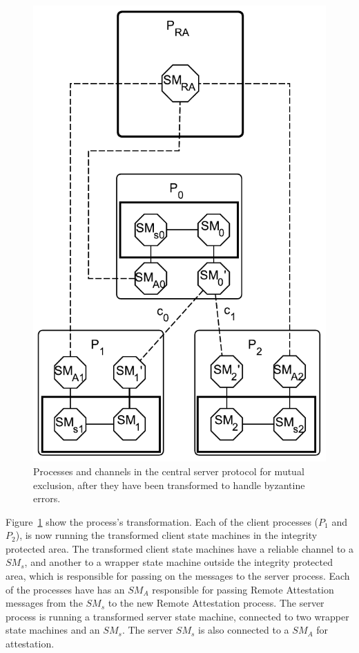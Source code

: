 \documentclass{article}
\begin{document}
		\FloatBarrier
		\begin{figure}[ht!]
			\center
			\includegraphics[scale=0.6]{figures/state-machines/CSME-protocol-transformed.pdf}
			\caption{Processes and channels in the central server protocol for mutual exclusion, after they have been transformed to handle byzantine errors.}
			\label{fig:CSME-protocol-transformed}
		\end{figure}
		\FloatBarrier

		Figure~\ref{fig:CSME-protocol-transformed} show the process's transformation.
		Each of the client processes ($P_1$ and $P_2$), is now running the transformed client state machines in the integrity protected area.
		The transformed client state machines have a reliable channel to a $SM_s$, and another to a wrapper state machine outside the integrity protected area, which is responsible for passing on the messages to the server process.
		Each of the processes have has an $SM_A$ responsible for passing Remote Attestation messages from the $SM_s$ to the new Remote Attestation process.
		The server process is running a transformed server state machine, connected to two wrapper state machines and an $SM_s$.
		The server $SM_s$ is also connected to a $SM_A$ for attestation.
\end{document}
